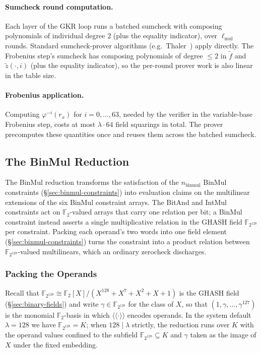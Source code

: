 \documentclass{article}
\theoremstyle{definition}
\newcommand*{\mle}{\widetilde}
\newcommand{\FF}[1]{\mathbb{F}_{#1}}
\newcommand{\gval}[1]{\langle\!\langle #1 \rangle\!\rangle}
\begin{document}
\paragraph{Sumcheck round computation.}
Each layer of the GKR loop runs a batched sumcheck with composing polynomials of individual degree $2$ (plus the equality indicator), over $\ell_\text{mul}$ rounds. Standard sumcheck-prover algorithms (e.g.\ Thaler~\cite[\S 4.1]{Thaler:2022aa}) apply directly. The Frobenius step's sumcheck has composing polynomials of degree $\leq 2$ in $\mle{f}$ and $\mle{z}(\cdot, i)$ (plus the equality indicator), so the per-round prover work is also linear in the table size.

\paragraph{Frobenius application.}
Computing $\varphi^{-i}(r_x)$ for $i = 0, \ldots, 63$, needed by the verifier in the variable-base Frobenius step, costs at most $\lambda \cdot 64$ field squarings in total. The prover precomputes these quantities once and reuses them across the batched sumcheck.

\subsection{The BinMul Reduction}
\label{sec:binmul}

The BinMul reduction transforms the satisfaction of the $n_\text{binmul}$ BinMul constraints (\S\ref{sec:binmul-constraints}) into evaluation claims on the multilinear extensions of the six BinMul constraint arrays. The BitAnd and IntMul constraints act on $\FF{2}$-valued arrays that carry one relation per bit; a BinMul constraint instead asserts a single multiplicative relation in the GHASH field $\FF{2^{128}}$ per constraint. Packing each operand's two words into one field element (\S\ref{sec:binmul-constraints}) turns the constraint into a product relation between $\FF{2^{128}}$-valued multilinears, which an ordinary zerocheck discharges.

\subsubsection{Packing the Operands}
\label{sec:binmul-packing}

Recall that $\FF{2^{128}} \cong \FF{2}[X] / (X^{128} + X^7 + X^2 + X + 1)$ is the GHASH field (\S\ref{sec:binary-fields}) and write $\gamma \in \FF{2^{128}}$ for the class of $X$, so that $(1, \gamma, \ldots, \gamma^{127})$ is the monomial $\FF{2}$-basis in which $\gval{\cdot}$ encodes operands. In the system default $\lambda = 128$ we have $\FF{2^{128}} = K$; when $128 \mid \lambda$ strictly, the reduction runs over $K$ with the operand values confined to the subfield $\FF{2^{128}} \subseteq K$ and $\gamma$ taken as the image of $X$ under the fixed embedding.
\end{document}
